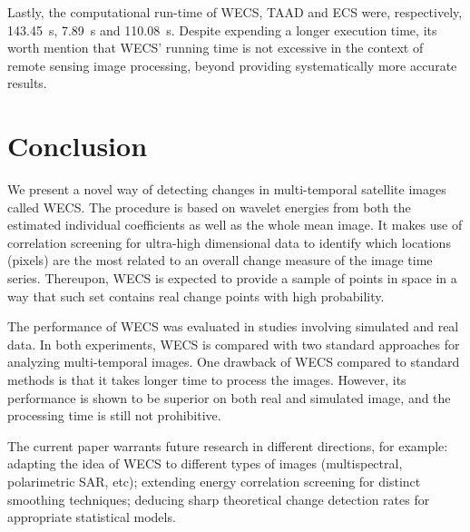 \documentclass[journal]{IEEEtran}
\begin{document}
Lastly, the computational run-time of WECS, TAAD and ECS were, respectively, \SI{143.45}{\second}, \SI{7.89}{\second} and \SI{110.08}{\second}. Despite expending a longer execution time, its worth mention that WECS' running time is not excessive in the context of remote sensing image processing, beyond providing systematically more accurate results.




\section{Conclusion}\label{section_discussion}


We present a novel way of detecting changes in multi-temporal satellite images called WECS. The procedure is based on wavelet energies from both the estimated individual coefficients as well as the whole mean image. It makes use of correlation screening for ultra-high dimensional data to identify which locations (pixels) are the most related to an overall change measure of the image time series. Thereupon, WECS is expected to provide a sample of points in space in a way that such set contains real change points with high probability. 

The performance of WECS was evaluated in studies involving simulated and real data. In both experiments, WECS is compared with two standard approaches for analyzing multi-temporal images. One drawback of WECS compared to standard methods is that it takes longer time to process the images. However, its performance is shown to be superior on both real and simulated image, and the processing time is still not prohibitive.

The current paper warrants future research in different directions, for example: adapting the idea of WECS to different types of images (multispectral, polarimetric SAR, etc); extending energy correlation screening for distinct smoothing techniques; deducing sharp theoretical change detection rates for appropriate statistical models.




\end{document}

